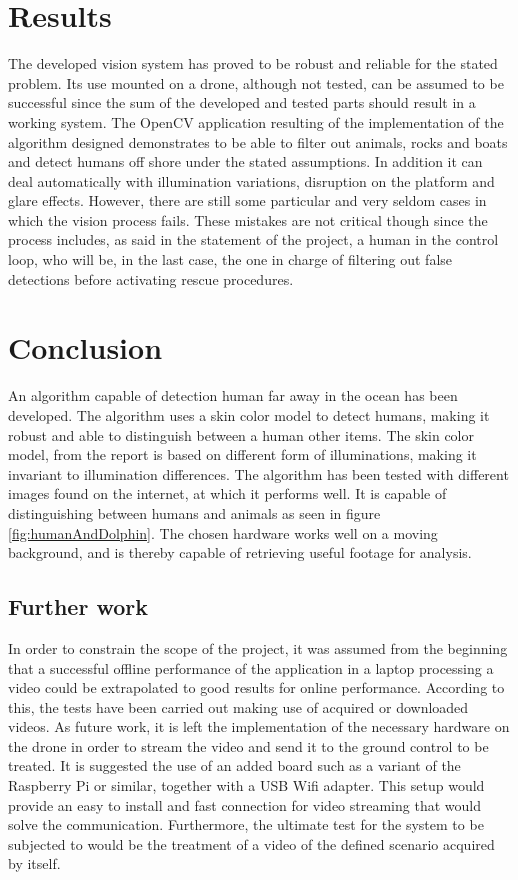\section{Results}
The developed vision system has proved to be robust and reliable for the stated problem.
Its use mounted on a drone, although not tested, can be assumed to be successful since the sum
of the developed and tested parts should result in a working system.
The OpenCV application resulting of the implementation of the algorithm designed demonstrates to be able to filter out animals,
rocks and boats and detect humans off shore under the stated assumptions. 
In addition it can deal automatically with illumination variations, disruption on the platform and glare effects.
However, there are still some particular and very seldom cases in which the vision process fails. 
These mistakes are not critical though since the process includes, as said in the statement of the project,
a human in the control loop, who will be, in the last case, the one in charge of filtering out false detections before activating rescue procedures.

\section{Conclusion}

An algorithm capable of detection human far away in the ocean has been developed. 
The algorithm uses a skin color model to detect humans,
making it robust and able to distinguish between a human other items.
The skin color model, from the report \cite{Ref:SkinDetection} is based on different form of illuminations, 
making it invariant to illumination differences. 
The algorithm has been tested with different images found on the internet,
at which it performs well. It is capable of distinguishing between humans and animals as seen in figure \ref{fig:humanAndDolphin}.
The chosen hardware works well on a moving background,
and is thereby capable of retrieving useful footage for analysis. 

\subsection{Further work} 
In order to constrain the scope of the project, it was assumed from the beginning that a successful offline
performance of the application in a laptop processing a video could be extrapolated to good results for online performance. 
According to this, the tests have been carried out making use of acquired or downloaded videos.
As future work, it is left the implementation of the necessary hardware on the drone in order to stream the video
and send it to the ground control to be treated.
It is suggested the use of an added board such as a variant of the Raspberry Pi or similar, together with a USB Wifi adapter.
This setup would provide an easy to install and fast connection for video streaming that would solve the communication.
Furthermore, the ultimate test for the system to be subjected to would be the treatment of a video of the defined scenario acquired by itself. 



\newpage
